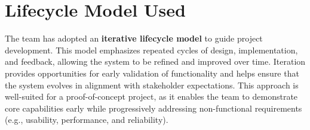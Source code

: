 \section{Lifecycle Model Used}

The team has adopted an \textbf{iterative lifecycle model} to guide project development. This model emphasizes repeated cycles of design, implementation, and feedback, allowing the system to be refined and improved over time. Iteration provides opportunities for early validation of functionality and helps ensure that the system evolves in alignment with stakeholder expectations. This approach is well-suited for a proof-of-concept project, as it enables the team to demonstrate core capabilities early while progressively addressing non-functional requirements (e.g., usability, performance, and reliability).